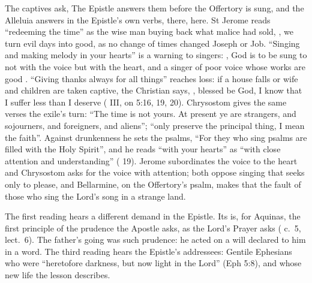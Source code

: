 The captives ask, 
The Epistle answers them before the Offertory is sung, and the Alleluia
answers in the Epistle's own verbs,  there,
 here. St Jerome reads ``redeeming the time'' as
the wise man buying back what malice had sold, , we turn evil days into good, as no change of times changed Joseph
or Job. ``Singing and making melody in your hearts'' is a warning to singers:
, God is to be sung to not with the
voice but with the heart, and a singer of poor voice whose works are good
. ``Giving thanks always for all things''
reaches loss: if a house falls or wife and children are taken captive, the
Christian says, ,
blessed be God, I know that I suffer less than I deserve ( III, on 5:16, 19, 20). Chrysostom gives the same verses
the exile's turn: ``The time is not yours. At present ye are strangers, and
sojourners, and foreigners, and aliens''; ``only preserve the principal thing,
I mean the faith''. Against drunkenness he sets the psalms, ``For they who sing
psalms are filled with the Holy Spirit'', and he reads ``with your hearts'' as
``with close attention and understanding'' ( 19).
Jerome subordinates the voice to the heart and Chrysostom asks for the voice
with attention; both oppose singing that seeks only to please, and Bellarmine,
on the Offertory's psalm, makes that the fault of those who sing the Lord's
song in a strange land.

The first reading hears a different demand in the Epistle. Its
 is, for Aquinas, the first
principle of the prudence the Apostle asks, as the Lord's Prayer asks
 ( c.~5, lect.~6). The
father's going was such prudence: he acted on a will declared to him in a
word. The third reading hears the Epistle's addressees: Gentile Ephesians who
were ``heretofore darkness, but now light in the Lord'' (Eph 5:8), and whose new
life the lesson describes.

